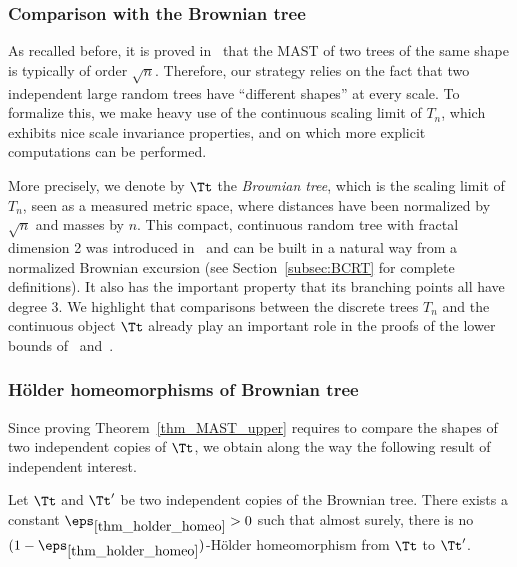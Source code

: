 \subsubsection*{Comparison with the Brownian tree}
As recalled before, it is proved in~\cite{misra_bounds_2019} that the MAST of two trees of the same shape is typically of order $\sqrt{n}$.
Therefore, our strategy relies on the fact that two independent large random trees have ``different shapes'' at every scale.
To formalize this, we make heavy use of the continuous scaling limit of $T_n$, which exhibits nice scale invariance properties, and on which more explicit computations can be performed.

More precisely, we denote by $\Tt$ the \emph{Brownian tree}, which is the scaling limit of~$T_n$, seen as a measured metric space, where distances have been normalized by $\sqrt{n}$ and masses by $n$.
This compact, continuous random tree with fractal dimension 2 was introduced in~\cite{Ald91} and can be built in a natural way from a normalized Brownian excursion (see Section~\ref{subsec:BCRT} for complete definitions). It also has the important property that its branching points all have degree $3$. We highlight that comparisons between the discrete trees $T_n$ and the continuous object $\Tt$ already play an important role in the proofs of the lower bounds of~\cite{aldous_largest_2022} and~\cite{Khez22}.

\subsubsection*{Hölder homeomorphisms of Brownian tree}
Since proving Theorem~\ref{thm_MAST_upper} requires to compare the shapes of two independent copies of $\Tt$, we obtain along the way the following result of independent interest.

\begin{theorem}\label{thm_holder_homeo}
Let $\Tt$ and $\Tt'$ be two independent copies of the Brownian tree. There exists a constant $\eps_{\ref{thm_holder_homeo}}>0$ such that almost surely, there is no $(1-\eps_{\ref{thm_holder_homeo}})$-Hölder homeomorphism from $\Tt$ to $\Tt'$.
\end{theorem}

